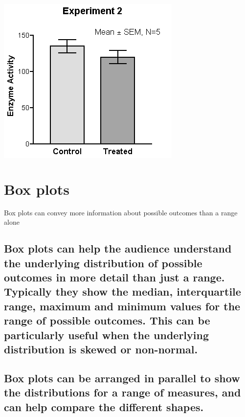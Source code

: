 \documentclass[]{book}
\begin{document}
\begin{center}\includegraphics{images/error_bars} \end{center}

\section{Box plots}\label{box-plots}

 Box plots can convey more information about possible outcomes than a
range alone

\subsection{Box plots can help the audience understand the underlying
distribution of possible outcomes in more detail than just a range.
Typically they show the median, interquartile range, maximum and minimum
values for the range of possible outcomes. This can be particularly
useful when the underlying distribution is skewed or
non-normal.}\label{box-plots-can-help-the-audience-understand-the-underlying-distribution-of-possible-outcomes-in-more-detail-than-just-a-range.-typically-they-show-the-median-interquartile-range-maximum-and-minimum-values-for-the-range-of-possible-outcomes.-this-can-be-particularly-useful-when-the-underlying-distribution-is-skewed-or-non-normal.}

\subsection{Box plots can be arranged in parallel to show the
distributions for a range of measures, and can help compare the
different
shapes.}\label{box-plots-can-be-arranged-in-parallel-to-show-the-distributions-for-a-range-of-measures-and-can-help-compare-the-different-shapes.}
\end{document}
